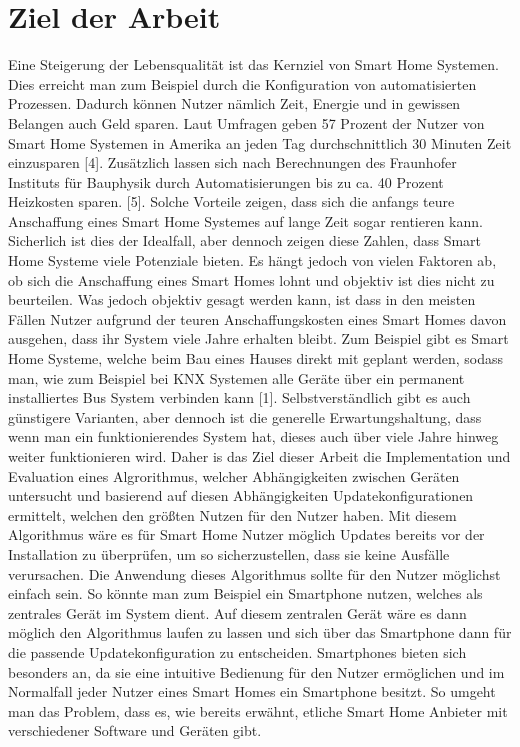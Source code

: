\section{Ziel der Arbeit}


Eine Steigerung der Lebensqualität ist das Kernziel von Smart Home Systemen. Dies erreicht man zum Beispiel durch die Konfiguration von 
automatisierten Prozessen. Dadurch können Nutzer nämlich Zeit, Energie und in gewissen Belangen auch Geld sparen. Laut Umfragen geben 57 Prozent der Nutzer von
Smart Home Systemen in Amerika an jeden Tag durchschnittlich 30 Minuten Zeit einzusparen [4].
Zusätzlich lassen sich nach Berechnungen des Fraunhofer Instituts für Bauphysik  durch Automatisierungen bis zu ca. 40 Prozent Heizkosten 
sparen. [5].
Solche Vorteile zeigen, dass sich die anfangs teure Anschaffung eines Smart Home Systemes auf lange Zeit sogar rentieren kann. Sicherlich 
ist dies der Idealfall, aber dennoch zeigen diese Zahlen, dass Smart Home Systeme viele Potenziale bieten. Es hängt jedoch von 
vielen Faktoren ab, ob sich die Anschaffung eines Smart Homes lohnt und objektiv ist dies nicht zu beurteilen. Was jedoch 
objektiv gesagt werden kann, ist dass in den meisten Fällen Nutzer aufgrund der teuren Anschaffungskosten eines Smart Homes davon ausgehen, dass 
ihr System viele Jahre erhalten bleibt. Zum Beispiel gibt es Smart Home Systeme, welche beim Bau eines Hauses direkt mit geplant werden,
sodass man, wie zum Beispiel bei KNX Systemen alle Geräte über ein permanent installiertes Bus System verbinden kann [1].
Selbstverständlich gibt es auch günstigere Varianten, aber dennoch ist die generelle Erwartungshaltung, dass wenn man ein funktionierendes System hat, dieses
auch über viele Jahre hinweg weiter funktionieren wird.
Daher is das Ziel dieser Arbeit die Implementation und Evaluation eines Algrorithmus, welcher 
Abhängigkeiten zwischen Geräten untersucht und basierend auf diesen Abhängigkeiten Updatekonfigurationen 
ermittelt, welchen den größten Nutzen für den Nutzer haben.
Mit diesem Algorithmus wäre es für Smart Home Nutzer möglich Updates bereits vor der Installation zu überprüfen, um so sicherzustellen, 
dass sie keine Ausfälle verursachen. Die Anwendung dieses Algorithmus sollte für den Nutzer möglichst einfach sein. So könnte man zum 
Beispiel ein Smartphone nutzen, welches als zentrales Gerät im System dient. Auf diesem zentralen Gerät wäre es dann möglich den 
Algorithmus laufen zu lassen und sich über das Smartphone dann für die passende Updatekonfiguration zu entscheiden. Smartphones
bieten sich besonders an, da sie eine intuitive Bedienung für den Nutzer ermöglichen und im Normalfall jeder Nutzer eines Smart Homes
ein Smartphone besitzt. So umgeht man das Problem, dass es, wie bereits erwähnt, etliche Smart Home Anbieter mit verschiedener
Software und Geräten gibt. 




 

